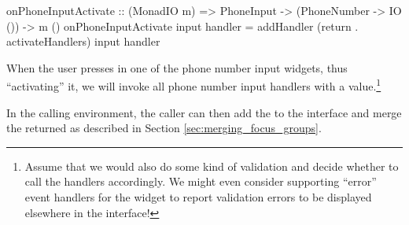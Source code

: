 \begin{haskellcode}
 onPhoneInputActivate :: (MonadIO m) => PhoneInput
                      -> (PhoneNumber -> IO ()) -> m ()
 onPhoneInputActivate input handler =
   addHandler (return . activateHandlers) input handler
\end{haskellcode}

When the user presses  in one of the phone number input
widgets, thus ``activating'' it, we will invoke all phone number input
handlers with a  value.\footnote{Assume that we would
  also do some kind of validation and decide whether to call the
  handlers accordingly.  We might even consider supporting ``error''
  event handlers for the widget to report validation errors to be
  displayed elsewhere in the interface!}

In the calling environment, the caller can then add the
 to the interface and merge the returned
 as described in Section
\ref{sec:merging_focus_groups}.
